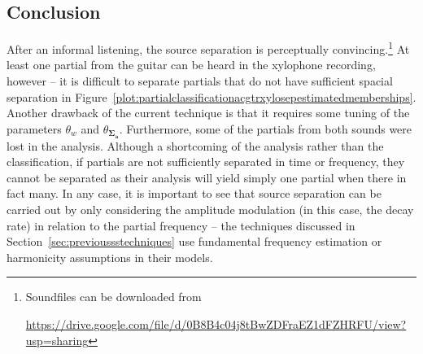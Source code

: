 \subsection{Conclusion}

After an informal listening, the
source separation is perceptually convincing.\footnote{Soundfiles can be
downloaded from \par
\url{https://drive.google.com/file/d/0B8B4c04j8tBwZDFraEZ1dFZHRFU/view?usp=sharing}}
At least one partial from the guitar can be heard in the xylophone recording,
however --
it is difficult to separate partials that do not have sufficient spacial separation in
Figure~\ref{plot:partialclassificationacgtrxylosepestimatedmemberships}. Another drawback of the current technique is that it requires some
tuning of the parameters $\theta_{w}$ and
$\theta_{\boldsymbol{\Sigma_{\boldsymbol{a}}}}$. Furthermore, some of the
partials from both sounds were lost in the analysis. Although a shortcoming of
the analysis rather than the classification, if partials are not sufficiently
separated in time or frequency, they cannot be separated as their analysis will
yield simply one partial when there in fact many. In any case, it is important
to see that source separation can be carried out by only considering the
amplitude modulation (in this case, the decay rate) in relation to the partial
frequency -- the techniques discussed in Section~\ref{sec:previoussstechniques}
use fundamental frequency estimation or harmonicity assumptions in their models.
